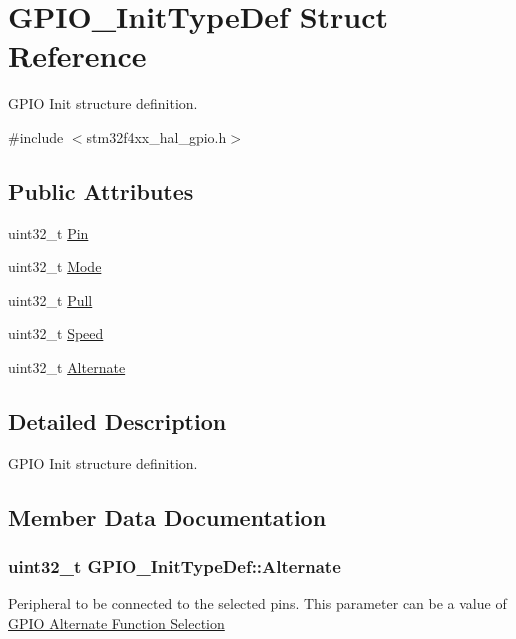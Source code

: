 \hypertarget{struct_g_p_i_o___init_type_def}{}\section{G\+P\+I\+O\+\_\+\+Init\+Type\+Def Struct Reference}
\label{struct_g_p_i_o___init_type_def}


G\+P\+IO Init structure definition.  




{\ttfamily \#include $<$stm32f4xx\+\_\+hal\+\_\+gpio.\+h$>$}

\subsection*{Public Attributes}
\begin{DoxyCompactItemize}
\item 
uint32\+\_\+t \hyperlink{struct_g_p_i_o___init_type_def_aa807fb62b2b2cf937092abba81370b87}{Pin}
\item 
uint32\+\_\+t \hyperlink{struct_g_p_i_o___init_type_def_a3731d84343e65a98fdf51056a8d30321}{Mode}
\item 
uint32\+\_\+t \hyperlink{struct_g_p_i_o___init_type_def_aa2d3a6b0c4e10ac20882b4a37799ced1}{Pull}
\item 
uint32\+\_\+t \hyperlink{struct_g_p_i_o___init_type_def_aae3b8ba407fb4f974cbce9cc03fc189d}{Speed}
\item 
uint32\+\_\+t \hyperlink{struct_g_p_i_o___init_type_def_aa1bf7132c974a10589d6574d50465256}{Alternate}
\end{DoxyCompactItemize}


\subsection{Detailed Description}
G\+P\+IO Init structure definition. 

\subsection{Member Data Documentation}
\subsubsection[{\texorpdfstring{Alternate}{Alternate}}]{\setlength{\rightskip}{0pt plus 5cm}uint32\+\_\+t G\+P\+I\+O\+\_\+\+Init\+Type\+Def\+::\+Alternate}\hypertarget{struct_g_p_i_o___init_type_def_aa1bf7132c974a10589d6574d50465256}{}\label{struct_g_p_i_o___init_type_def_aa1bf7132c974a10589d6574d50465256}
Peripheral to be connected to the selected pins. This parameter can be a value of \hyperlink{group___g_p_i_o___alternate__function__selection}{G\+P\+IO Alternate Function Selection} 
